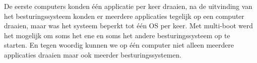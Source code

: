 De eerste computers konden \'e\'en applicatie per keer draaien, na de uitvinding van het besturingssysteem konden er meerdere applicaties tegelijk op een computer draaien, maar was het systeem beperkt tot \'e\'en OS per keer. Met multi-boot werd het mogelijk om soms het ene en soms het andere besturingssysteem op te starten. En tegen woordig kunnen we op \'e\'en computer niet alleen meerdere applicaties draaien maar ook meerder besturingssystemen.
